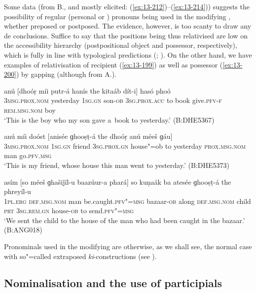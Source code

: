 Some data (from B., and mostly elicited: (\ref{ex:13-212})--(\ref{ex:13-214})) suggests the possibility of regular  (personal or ) pronouns being used in the modifying , whether preposed or postposed. The evidence, however, is too scanty to draw any de conclusions. Suffice to say that the positions being thus relativised are low on the accessibility hierarchy (postpositional object and possessor, respectively), which is fully in line with typological predictions (\citealt[147--148]{keenan1985}; \citealt[226]{andrews_relative2007}). On the other hand, we have examples of relativisation of recipient (\ref{ex:13-199}) as well as possessor (\ref{ex:13-200}) by gapping (although from A.).

\begin{exe}
\ex
\label{ex:13-212}
\gll anú [dhoóṛ míi putr-á hanís the  kitaáb dít-i] hasó phoó  \\
\textsc{3msg.prox.nom} yesterday \textsc{1sg.gn} son-\textsc{ob} \textsc{3sg.prox.acc} to  book give.\textsc{pfv-f} \textsc{rem.msg.nom} boy \\
\glt `This is the boy who my son gave a~book to yesterday.' (B:DHE5367)

\ex
\label{ex:13-213}
\gll anú míi doóst [anisée ɡhooṣṭ-á the  dhoóṛ anú méeš ɡáu] \\
\textsc{3msg.prox.nom} \textsc{1sg.gn} friend \textsc{3sg.prox.gn} house"=ob to  yesterday \textsc{prox.msg.nom} man go.\textsc{pfv.msg} \\
\glt `This is my friend, whose house this man went to yesterday.' (B:DHE5373)

\ex
\label{ex:13-214}
\gll asím [so méeš ɡhašiǰíl-u baazúur-a  phará] so kuṇaák ba atesée
ɡhooṣṭ-á  the phreyíl-u \\
\textsc{1pl.erg} \textsc{def.msg.nom} man be.caught.\textsc{pfv"=msg} bazaar-\textsc{ob}  along \textsc{ def.msg.nom} child \textsc{prt} \textsc{3sg.rem.gn} house-\textsc{ob} to send.\textsc{pfv"=msg} \\
\glt `We sent the child to the house of the man who had been caught in the bazaar.' (B:ANG018) 
\end{exe}

Pronominals used in the modifying  are otherwise, as we shall see, the normal case with so"=called extraposed \textit{ki}-constructions (see ). 


\subsection{Nominalisation and the use of participials}
\label{subsec:13-6-6}


